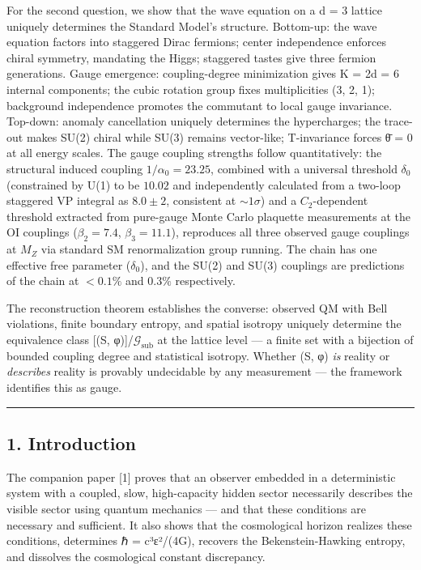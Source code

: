 \documentclass[
  11pt,
]{article}
\begin{document}
For the second question, we show that the wave equation on a d = 3
lattice uniquely determines the Standard Model's structure. Bottom-up:
the wave equation factors into staggered Dirac fermions; center
independence enforces chiral symmetry, mandating the Higgs; staggered
tastes give three fermion generations. Gauge emergence: coupling-degree
minimization gives K = 2d = 6 internal components; the cubic rotation
group fixes multiplicities (3, 2, 1); background independence promotes
the commutant to local gauge invariance. Top-down: anomaly cancellation
uniquely determines the hypercharges; the trace-out makes SU(2) chiral
while SU(3) remains vector-like; T-invariance forces θ̄ = 0 at all energy
scales. The gauge coupling strengths follow quantitatively: the
structural induced coupling \(1/\alpha_0 = 23.25\), combined with a
universal threshold \(\delta_0\) (constrained by U(1) to be \(10.02\)
and independently calculated from a two-loop staggered VP integral as
\(8.0 \pm 2\), consistent at \(\sim 1\sigma\)) and a \(C_2\)-dependent
threshold extracted from pure-gauge Monte Carlo plaquette measurements
at the OI couplings (\(\beta_2 = 7.4\), \(\beta_3 = 11.1\)), reproduces
all three observed gauge couplings at \(M_Z\) via standard SM
renormalization group running. The chain has one effective free
parameter (\(\delta_0\)), and the SU(2) and SU(3) couplings are
predictions of the chain at \(<0.1\%\) and \(0.3\%\) respectively.

The reconstruction theorem establishes the converse: observed QM with
Bell violations, finite boundary entropy, and spatial isotropy uniquely
determine the equivalence class {[}(S,
φ){]}/\(\mathcal{G}_{\text{sub}}\) at the lattice level --- a finite set
with a bijection of bounded coupling degree and statistical isotropy.
Whether (S, φ) \emph{is} reality or \emph{describes} reality is provably
undecidable by any measurement --- the framework identifies this as
gauge.

\begin{center}\rule{0.5\linewidth}{0.5pt}\end{center}

\hypertarget{introduction}{%
\subsection{1. Introduction}\label{introduction}}

The companion paper {[}1{]} proves that an observer embedded in a
deterministic system with a coupled, slow, high-capacity hidden sector
necessarily describes the visible sector using quantum mechanics --- and
that these conditions are necessary and sufficient. It also shows that
the cosmological horizon realizes these conditions, determines ℏ =
c³ε²/(4G), recovers the Bekenstein-Hawking entropy, and dissolves the
cosmological constant discrepancy.
\end{document}
